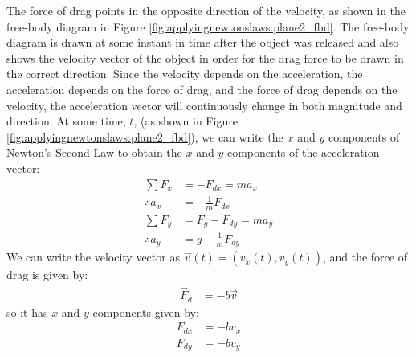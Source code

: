 \begin{solution}
\begin{parts}
\item The force of drag points in the opposite direction of the velocity, as shown in the free-body diagram in Figure \ref{fig:applyingnewtonslaws:plane2_fbd}. The free-body diagram is drawn at some instant in time after the object was released and also shows the velocity vector of the object in order for the drag force to be drawn in the correct direction. 
Since the velocity depends on the acceleration, the acceleration depends on the force of drag, and the force of drag depends on the velocity, the acceleration vector will continuously change in both magnitude and direction. At some time, $t$, (as shown in Figure \ref{fig:applyingnewtonslaws:plane2_fbd}), we can write the $x$ and $y$ components of Newton's Second Law to obtain the $x$ and $y$ components of the acceleration vector:
\begin{align*}
\sum F_x &= -F_{dx} = ma_x \\
\therefore a_x &= -\frac{1}{m}F_{dx}\\
\sum F_y &= F_g-F_{dy} = ma_y \\
\therefore a_y &= g-\frac{1}{m}F_{dy}
\end{align*}
We can write the velocity vector as $\vec v(t) = (v_x(t), v_y(t))$, and the force of drag is given by:
\begin{align*}
\vec F_d&=-b\vec v
\end{align*}
so it has $x$ and $y$ components given by:
\begin{align*}
F_{dx}&=-bv_x\\
F_{dy}&=-bv_y
\end{align*}


\end{parts}
\end{solution}
